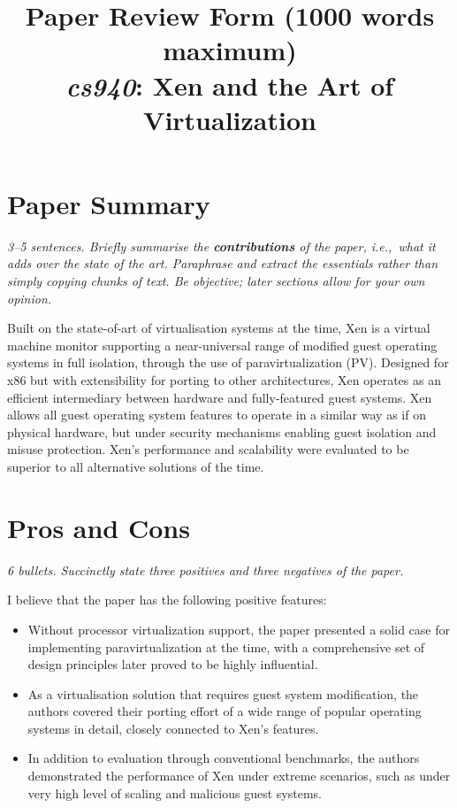 \documentclass[11pt]{article}
\begin{document}
\title{Paper Review Form (1000 words maximum)\\
  \emph{cs940}: Xen and the Art of Virtualization \cite{barham2003xen}}
\maketitle

\section*{Paper Summary}
\textsl{3--5 sentences. Briefly summarise the {\bf contributions} of the paper, i.e.,~what it adds over the state of the art. Paraphrase and extract the essentials rather than simply copying chunks of text. Be objective; later sections allow for your own opinion.}

Built on the state-of-art of virtualisation systems at the time, Xen is a virtual machine monitor supporting a near-universal range of modified guest operating systems in full isolation, through the use of paravirtualization (PV). Designed for x86 but with extensibility for porting to other architectures, Xen operates as an efficient intermediary between hardware and fully-featured guest systems. Xen allows all guest operating system features to operate in a similar way as if on physical hardware, but under security mechanisms enabling guest isolation and misuse protection. Xen's performance and scalability were evaluated to be superior to all alternative solutions of the time.

\section*{Pros and Cons}
\textsl{6 bullets. Succinctly state three positives and three negatives of the paper.}

I believe that the paper has the following positive features:
\begin{itemize}
	\item Without processor virtualization support, the paper presented a solid case for implementing paravirtualization at the time, with a comprehensive set of design principles later proved to be highly influential. 
	\item As a virtualisation solution that requires guest system modification, the authors covered their porting effort of a wide range of popular operating systems in detail, closely connected to Xen's features.
	\item In addition to evaluation through conventional benchmarks, the authors demonstrated the performance of Xen under extreme scenarios, such as under very high level of scaling and malicious guest systems.
\end{itemize}
\end{document}
